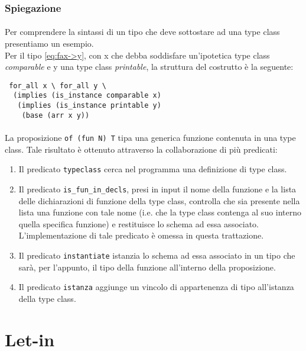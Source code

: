 \documentclass[12pt,a4paper,openright,twoside]{report}
\begin{document}
\subsubsection{Spiegazione}

\paragraph{}
Per comprendere la sintassi di un tipo che deve sottostare ad una type class presentiamo un esempio.\\
Per il tipo \eqref{eq:fax->y}, con x che debba soddisfare un'ipotetica type class \textit{comparable} e y una type class \textit{printable}, la struttura del costrutto è la seguente:
\begin{verbatim}
 for_all x \ for_all y \
  (implies (is_instance comparable x)
   (implies (is_instance printable y)
    (base (arr x y))
\end{verbatim}

\paragraph{}
La proposizione \verb"of (fun N) T" tipa una generica funzione contenuta in una type class. Tale risultato è ottenuto attraverso la collaborazione di più predicati:
\begin{enumerate}
 \item Il predicato \verb"typeclass" cerca nel programma una definizione di type class.
 \item Il predicato \verb"is_fun_in_decls", presi in input il nome della funzione e la lista delle dichiarazioni di funzione della type class, controlla che sia presente nella lista una funzione con tale nome (i.e. che la type class contenga al suo interno quella specifica funzione) e restituisce lo schema ad essa associato.\\
 L'implementazione di tale predicato è omessa in questa trattazione.
 \item Il predicato \verb"instantiate" istanzia lo schema ad essa associato in un tipo che sarà, per l'appunto, il tipo della funzione all'interno della proposizione.
 \item Il predicato \verb"istanza" aggiunge un vincolo di appartenenza di tipo all'istanza della type class.
\end{enumerate}

\section{Let-in}
\end{document}
